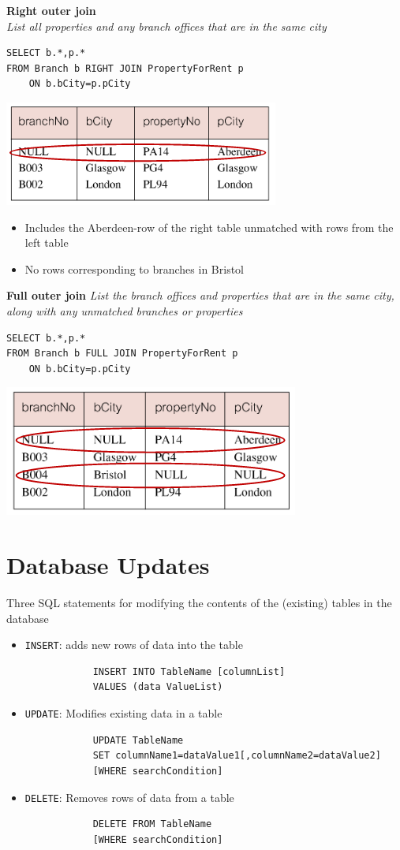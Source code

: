 \documentclass{article}[18pt]
\begin{document}
\textbf{Right outer join}\\
\textit{List all properties and any branch offices that are in the same city}
\begin{verbatim}
SELECT b.*,p.*
FROM Branch b RIGHT JOIN PropertyForRent p
	ON b.bCity=p.pCity
\end{verbatim}
\begin{center}
	\includegraphics[scale=0.7]{"Right Outer"}
\end{center}
\begin{itemize}
	\item Includes the Aberdeen-row of the right table unmatched with rows from the left table
	\item No rows corresponding to branches in Bristol
\end{itemize}
\textbf{Full outer join}
\textit{List the branch offices and properties that are in the same city, along with any unmatched branches or properties}
\begin{verbatim}
SELECT b.*,p.*
FROM Branch b FULL JOIN PropertyForRent p
	ON b.bCity=p.pCity
\end{verbatim}
\begin{center}
	\includegraphics[scale=0.7]{Full}
\end{center}
\section{Database Updates}
Three SQL statements for modifying the contents of the (existing) tables in the database
\begin{itemize}
	\item \texttt{INSERT}: adds new rows of data into the table
	\begin{verbatim}
			INSERT INTO TableName [columnList]
			VALUES (data ValueList)
	\end{verbatim}
	\item \texttt{UPDATE}: Modifies existing data in a table
	\begin{verbatim}
			UPDATE TableName
			SET columnName1=dataValue1[,columnName2=dataValue2]
			[WHERE searchCondition]
	\end{verbatim}
	\item \texttt{DELETE}: Removes rows of data from a table
	\begin{verbatim}
			DELETE FROM TableName
			[WHERE searchCondition]
	\end{verbatim}
\end{itemize}
\end{document}
